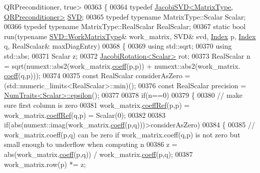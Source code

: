 \begin{DoxyCode}
      QRPreconditioner, true>
00363 \{
00364   \textcolor{keyword}{typedef} \hyperlink{group___s_v_d___module_class_eigen_1_1_jacobi_s_v_d}{JacobiSVD<MatrixType, QRPreconditioner>} 
      \hyperlink{group___s_v_d___module_class_eigen_1_1_jacobi_s_v_d}{SVD};
00365   \textcolor{keyword}{typedef} \textcolor{keyword}{typename} MatrixType::Scalar Scalar;
00366   \textcolor{keyword}{typedef} \textcolor{keyword}{typename} MatrixType::RealScalar RealScalar;
00367   \textcolor{keyword}{static} \textcolor{keywordtype}{bool} run(\textcolor{keyword}{typename} \hyperlink{group___core___module}{SVD::WorkMatrixType}& work\_matrix, SVD& svd, 
      \hyperlink{namespace_eigen_a62e77e0933482dafde8fe197d9a2cfde}{Index} p, \hyperlink{namespace_eigen_a62e77e0933482dafde8fe197d9a2cfde}{Index} q, RealScalar& maxDiagEntry)
00368   \{
00369     \textcolor{keyword}{using} std::sqrt;
00370     \textcolor{keyword}{using} std::abs;
00371     Scalar z;
00372     \hyperlink{group___jacobi___module_class_eigen_1_1_jacobi_rotation}{JacobiRotation<Scalar>} rot;
00373     RealScalar n = sqrt(numext::abs2(work\_matrix.\hyperlink{class_eigen_1_1_plain_object_base_afbfc12954f16d21aedb7bd839f64a278}{coeff}(p,p)) + numext::abs2(work\_matrix.
      \hyperlink{class_eigen_1_1_plain_object_base_afbfc12954f16d21aedb7bd839f64a278}{coeff}(q,p)));
00374 
00375     \textcolor{keyword}{const} RealScalar considerAsZero = (std::numeric\_limits<RealScalar>::min)();
00376     \textcolor{keyword}{const} RealScalar precision = \hyperlink{group___core___module_struct_eigen_1_1_num_traits}{NumTraits<Scalar>::epsilon}();
00377 
00378     \textcolor{keywordflow}{if}(n==0)
00379     \{
00380       \textcolor{comment}{// make sure first column is zero}
00381       work\_matrix.\hyperlink{class_eigen_1_1_plain_object_base_a25626a55b26a4323565f79d1b7c48ea8}{coeffRef}(p,p) = work\_matrix.\hyperlink{class_eigen_1_1_plain_object_base_a25626a55b26a4323565f79d1b7c48ea8}{coeffRef}(q,p) = Scalar(0);
00382 
00383       \textcolor{keywordflow}{if}(abs(numext::imag(work\_matrix.\hyperlink{class_eigen_1_1_plain_object_base_afbfc12954f16d21aedb7bd839f64a278}{coeff}(p,q)))>considerAsZero)
00384       \{
00385         \textcolor{comment}{// work\_matrix.coeff(p,q) can be zero if work\_matrix.coeff(q,p) is not zero but small enough to
       underflow when computing n}
00386         z = abs(work\_matrix.\hyperlink{class_eigen_1_1_plain_object_base_afbfc12954f16d21aedb7bd839f64a278}{coeff}(p,q)) / work\_matrix.\hyperlink{class_eigen_1_1_plain_object_base_afbfc12954f16d21aedb7bd839f64a278}{coeff}(p,q);
00387         work\_matrix.row(p) *= z;

\end{DoxyCode}

